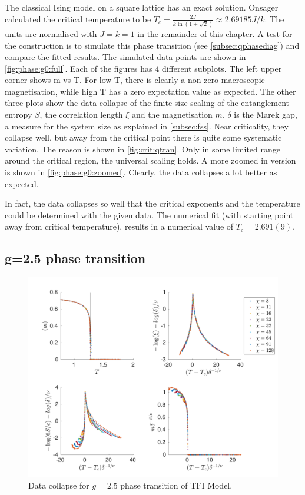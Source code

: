 The classical Ising model on a square lattice has an exact solution. Onsager calculated the critical temperature to be $T_c = \frac{2 J}{k \ln(1+\sqrt{2}) } \approx 2.69185 J/k$.  The units are normalised with $J=k=1$ in the remainder of this chapter. A test for the construction is to simulate this phase transition (see \cref{subsec:qphasediag}) and compare the fitted  results. The simulated data points are shown in \cref{fig:phase:g0:full}. Each of the figures has 4 different subplots. The left upper corner shows m vs T. For low T, there is clearly a non-zero macroscopic magnetisation, while high T has a zero expectation value as expected. The other three plots show the data collapse of the finite-size scaling of the entanglement entropy $S$, the correlation length $\xi$ and the magnetisation $m$. $\delta$ is the Marek gap, a measure for the system size as explained in \cref{subsec:fss}. Near criticality, they collapse well, but away from the critical point there is quite some systematic variation. The reason is shown in \cref{fig:crit:qtran}. Only in some limited range around the critical region, the universal scaling holds. A more zoomed in version is shown in \cref{fig:phase:g0:zoomed}. Clearly, the data collapses a lot better as expected.

In fact, the data collapses so well that the critical exponents and the temperature could be determined with the given data. The numerical fit (with starting point away from  critical temperature), results in a numerical value of $T_c = 2.691(9) $.

\subsection{g=2.5 phase transition}

\begin{figure}[!htbp]
  \center
  \includegraphics[width=\textwidth]{Figuren/phasediag/g25/Full.pdf}
  \caption{ Data collapse for $g=2.5$ phase transition of \Gls{TFI} Model. }
  \label{fig:phase:g25:full}
\end{figure}

